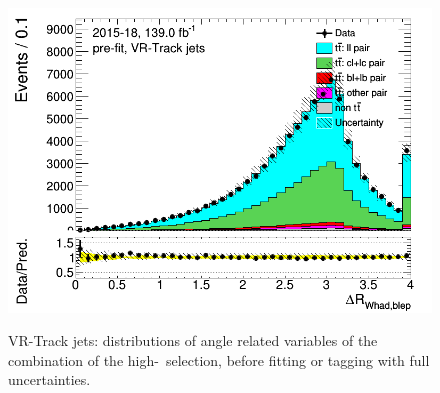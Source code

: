 \documentclass[letterpaper,12pt]{article}
\begin{document}
\begin{figure}[H]
\includegraphics[width=.45\textwidth]{FTAG_plots/pretagNoRwnewonlyVRJetsall/DataMC_h_dRWhadbleptrackjet.png} \\
\caption{VR-Track jets: distributions of angle related variables of the combination 
of the high-\pt\ selection, before fitting or tagging with full uncertainties.} \label{fig:highpT_angles_VRJets}
\end{figure}
\end{document}
